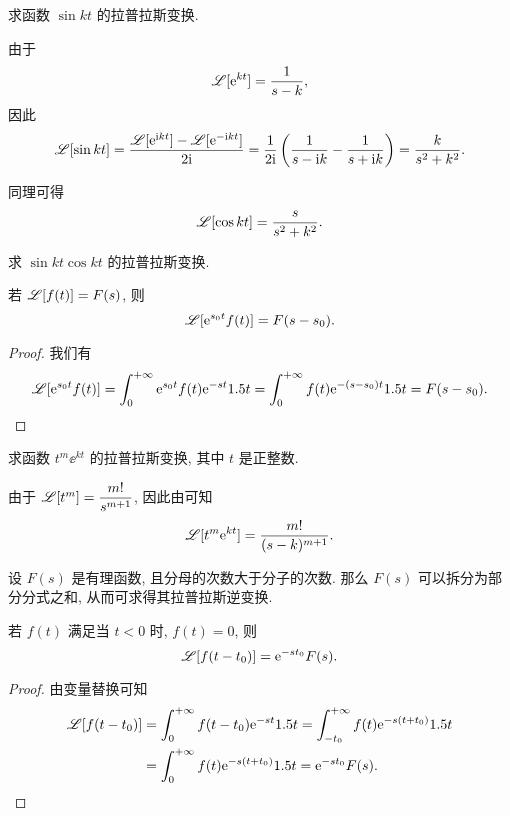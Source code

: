\begin{example}
  求函数 $\sin{kt}$ 的拉普拉斯变换.
\end{example}

\begin{solution}
  由于
  \[
    \mathscr{L}[\mathrm{e}^{kt}]=\frac1{s-k},
  \]
  因此
  \[
     \mathscr{L}[\sin{kt}]
    =\frac{\mathscr{L}[\mathrm{e}^{\mathrm{i} kt}]-\mathscr{L}[\mathrm{e}^{-\mathrm{i} kt}]}{2\mathrm{i} }
    =\frac1{2\mathrm{i} }\left(\frac1{s-\mathrm{i} k}-\frac1{s+\mathrm{i} k}\right)
    =\frac k{s^2+k^2}.
  \]
\end{solution}

同理可得
\[
  \mathscr{L}[\cos kt]=\frac{s}{s^2+k^2}.
\]

\begin{exercise}
  求 $\sin{kt}\cos{kt}$ 的拉普拉斯变换.
\end{exercise}

\begin{theorem}[位移性质]
  \label{thm:laplace-shift-property}
  若 $\mathscr{L}[f(t)]=F(s)$, 则 
  \[
    \mathscr{L}[\mathrm{e}^{s_0 t}f(t)]=F(s-s_0).
  \]
\end{theorem}

\begin{proof}
  我们有
  \begin{align*}
     \mathscr{L}[\mathrm{e}^{s_0 t}f(t)]
    =\displaystyle\int_0^{+\infty} \mathrm{e}^{s_0 t}f(t)\mathrm{e}^{-st}1.5 t
    =\displaystyle\int_0^{+\infty} f(t)\mathrm{e}^{-(s-s_0) t}1.5 t
     =F(s-s_0).\qedhere
  \end{align*}
\end{proof}

\begin{example}
  求函数 $t^m\ee^{kt}$ 的拉普拉斯变换, 其中 $t$ 是正整数.
\end{example}

\begin{solution}
  由于 $\mathscr{L}[t^m]=\dfrac{m!}{s^{m+1}}$, 因此由\thmLShift 可知
  \[
    \mathscr{L}[t^m\mathrm{e}^{kt}]=\frac{m!}{(s-k)^{m+1}}.
  \]
\end{solution}

设 $F(s)$ 是有理函数, 且分母的次数大于分子的次数.
那么 $F(s)$ 可以拆分为部分分式之和, 从而可求得其拉普拉斯逆变换.

\begin{theorem}[延迟性质]
  若 $f(t)$ 满足当 $t<0$ 时, $f(t)=0$, 则
  \[
    \mathscr{L}[f(t-t_0)]=\mathrm{e}^{-s t_0}F(s).
  \]
\end{theorem}

\begin{proof}
  由变量替换可知
  \begin{align*}
      \mathscr{L}[f(t-t_0)]
    &=\displaystyle\int_0^{+\infty} f(t-t_0)\mathrm{e}^{-s t}1.5 t
     =\int_{-t_0}^{+\infty} f(t)\mathrm{e}^{-s(t+t_0)}1.5 t\\
    &=\displaystyle\int_0^{+\infty} f(t)\mathrm{e}^{-s(t+t_0)}1.5 t
     =\mathrm{e}^{-s t_0}F(s).\qedhere
  \end{align*}
\end{proof}

